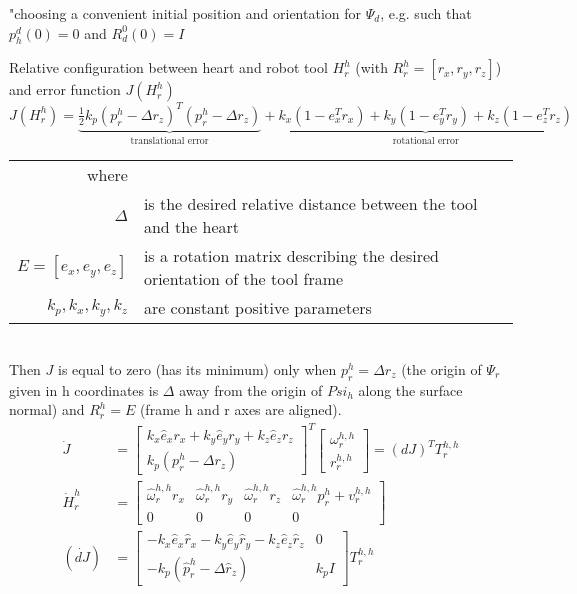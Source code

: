 "choosing a convenient initial position and orientation for $\Psi_d$, e.g. such that $p^d_h(0)=0$ and $R^0_d(0) = I$

Relative configuration between heart and robot tool $H^h_r$ (with $R^h_r =[r_x, r_y, r_z]$) and error function $J(H^h_r)$
\begin{equation}
J(H^h_r) = \underbrace{\tfrac{1}{2}k_p (p^h_r-\Delta r_z)^T(p^h_r-\Delta r_z)}_\text{translational error} + \underbrace{k_x (1-e_x^T r_x) + k_y (1-e_y^T r_y) + k_z (1-e_z^T r_z)}_\text{rotational error}
\end{equation}
\begin{tabular}{rl}
	where &\\
	$\Delta$ & is the desired relative distance between the tool and the heart\\
	$E=[e_x,e_y,e_z]$ & is a rotation matrix describing the desired orientation of the tool frame\\
	$k_p,k_x,k_y,k_z$ & are constant positive parameters\\
\end{tabular}\\

Then $J$ is equal to zero (has its minimum) only when $p^h_r=\Delta r_z$ (the origin of $\Psi_r$ given in h coordinates is $\Delta$ away from the origin of $Psi_h$ along the surface normal) and $R^h_r=E$ (frame h and r axes are aligned).
\begin{align}
\dot{J} &= 
\begin{bmatrix}
k_x \hat{e}_x r_x + k_y \hat{e}_y r_y + k_z \hat{e}_z r_z\\
k_p(p^h_r - \Delta r_z)
\end{bmatrix}^T
\begin{bmatrix}
\omega^{h,h}_r \\
r^{h,h}_r
\end{bmatrix}
= (dJ)^T T^{h,h}_r\\
\dot{H}^h_r &= 
\begin{bmatrix}
\hat{\omega}^{h,h}_r r_x & \hat{\omega}^{h,h}_r r_y & \hat{\omega}^{h,h}_r r_z & \hat{\omega}^{h,h}_r p^h_r + v^{h,h}_r\\
0 & 0 & 0 & 0
\end{bmatrix}\\
(\dot{dJ}) &=
\begin{bmatrix}
-k_x \hat{e}_x \hat{r}_x  - k_y \hat{e}_y \hat{r}_y - k_z \hat{e}_z \hat{r}_z & 0\\
-k_p(\hat{p}^h_r - \Delta \hat{r}_z) & k_p I
\end{bmatrix}
T^{h,h}_r
\end{align}

